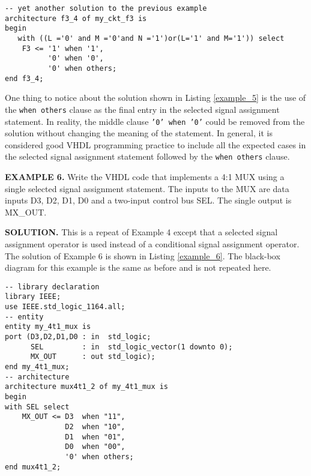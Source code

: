 \noindent
\begin{minipage}{0.99\linewidth}
\begin{lstlisting}[label=example_5, caption=Solution of Example 5.]
-- yet another solution to the previous example
architecture f3_4 of my_ckt_f3 is
begin
   with ((L ='0' and M ='0'and N ='1')or(L='1' and M='1')) select
	F3 <= '1' when '1',
	      '0' when '0',
	      '0' when others;
end f3_4;
\end{lstlisting}
\end{minipage}

One thing to notice about the solution shown in Listing \ref{example_5} is the use of the \texttt{when others} clause as the final entry in the selected signal assignment statement. In reality, the middle clause \texttt{'0' when '0'} could be removed from the solution without changing the meaning of the statement. In general, it is considered good VHDL programming practice to include all the expected cases in the selected signal assignment statement followed by the \texttt{when others} clause.
\begin{leftbar}
\noindent
\textbf{EXAMPLE 6.}
Write the VHDL code that implements a 4:1 MUX using a single selected signal assignment statement. The inputs to the MUX are data inputs D3, D2, D1, D0 and a two-input control bus SEL. The single output is MX\_OUT.
\end{leftbar}
\noindent
\textbf{SOLUTION.} This is a repeat of Example 4 except that a selected signal assignment operator is used instead of a conditional signal assignment operator. The solution of Example 6 is shown in Listing \ref{example_6}. The black-box diagram for this example is the same as before and is not repeated here.

\begin{lstlisting}[float, label=example_6, caption=Solution of Example 6.]
-- library declaration
library IEEE;
use IEEE.std_logic_1164.all;
-- entity
entity my_4t1_mux is
port (D3,D2,D1,D0 : in  std_logic;
      SEL         : in  std_logic_vector(1 downto 0);
      MX_OUT      : out std_logic);
end my_4t1_mux;
-- architecture
architecture mux4t1_2 of my_4t1_mux is
begin
with SEL select
	MX_OUT <= D3  when "11",
	          D2  when "10",
	          D1  when "01",
	          D0  when "00",
	          '0' when others;
end mux4t1_2;
\end{lstlisting}

